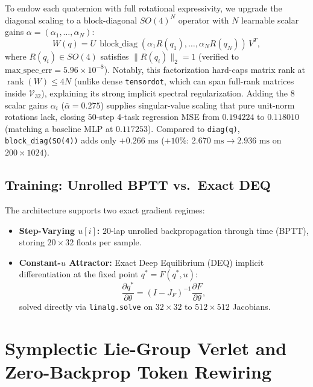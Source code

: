 \documentclass[11pt,twocolumn]{article}
\begin{document}
To endow each quaternion with full rotational expressivity, we upgrade the diagonal scaling to a block-diagonal $SO(4)^N$ operator with $N$ learnable scalar gains $\alpha = (\alpha_1, \dots, \alpha_N)$:
\begin{equation}
W(q) = U\,\operatorname{block\_diag}\!\left(\alpha_1 R(q_1), \dots, \alpha_N R(q_N)\right)\,V^T,
\end{equation}
where $R(q_i) \in SO(4)$ satisfies $\|R(q_i)\|_2 = 1$ (verified to $\text{max\_spec\_err} = 5.96 \times 10^{-8}$). Notably, this factorization hard-caps matrix rank at $\operatorname{rank}(W) \le 4N$ (unlike dense \texttt{tensordot}, which can span full-rank matrices inside $\mathcal{V}_{32}$), explaining its strong implicit spectral regularization. Adding the $8$ scalar gains $\alpha_i$ ($\bar{\alpha} = 0.275$) supplies singular-value scaling that pure unit-norm rotations lack, closing $50$-step $4$-task regression MSE from $0.194224$ to $0.118010$ (matching a baseline MLP at $0.117253$). Compared to \texttt{diag(q)}, \texttt{block\_diag(SO(4))} adds only $+0.266\text{ ms}$ ($+10\%$: $2.670\text{ ms} \to 2.936\text{ ms}$ on $200 \times 1024$).

\subsection{Training: Unrolled BPTT vs.\ Exact DEQ}
The architecture supports two exact gradient regimes:
\begin{itemize}
    \item \textbf{Step-Varying $u[i]$:} $20$-lap unrolled backpropagation through time (BPTT), storing $20 \times 32$ floats per sample.
    \item \textbf{Constant-$u$ Attractor:} Exact Deep Equilibrium (DEQ) implicit differentiation at the fixed point $q^* = F(q^*, u)$:
    \begin{equation}
    \frac{\partial q^*}{\partial \theta} = (I - J_F)^{-1} \frac{\partial F}{\partial \theta},
    \end{equation}
    solved directly via \texttt{linalg.solve} on $32 \times 32$ to $512 \times 512$ Jacobians.
\end{itemize}

\section{Symplectic Lie-Group Verlet and Zero-Backprop Token Rewiring}
\end{document}
